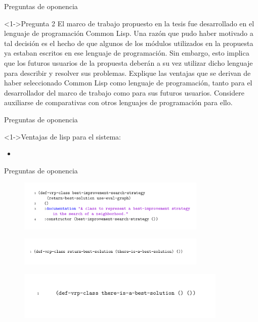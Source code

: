 \begin{frame}{Preguntas de oponencia}
	\begin{block}<1->{Pregunta 2}
		El marco de trabajo propuesto en la tesis fue desarrollado en el lenguaje de programación Common Lisp. Una razón que pudo haber motivado a tal decisión es el hecho de que algunos de los módulos utilizados en la propuesta ya estaban escritos en ese lenguaje de programación. Sin embargo, esto implica que los futuros usuarios de la propuesta deberán a su vez utilizar dicho lenguaje para describir y resolver sus problemas. Explique las ventajas que se derivan de haber seleccionado Common Lisp como lenguaje de programación, tanto para el desarrollador del marco de trabajo como para sus futuros usuarios. Considere auxiliarse de comparativas con otros lenguajes de programación para ello.
	\end{block}
	
\end{frame}

\begin{frame}{Preguntas de oponencia}
	\begin{block}<1->{Ventajas de lisp para el sistema:}
		\begin{itemize}
			\item {}
		\end{itemize}
		\vspace{5.5 mm}
	\end{block}
	
\end{frame}

\begin{frame}{Preguntas de oponencia}
	\onslide<1->\begin{figure}
	\includegraphics[width=9cm]{img/best-improvement.png}
\end{figure}

	\begin{figure}
	\includegraphics[width=9cm]{img/return-best.png}
\end{figure}

	\begin{figure}
	\includegraphics[width=10cm]{img/there-is-best.png}
\end{figure}
\end{frame}


